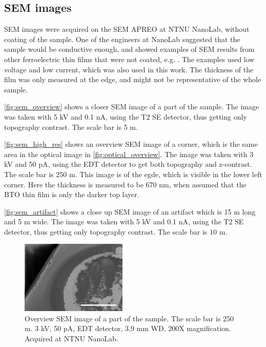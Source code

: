\subsection{SEM images}
\label{results:SEM}

SEM images were acquired on the SEM APREO at NTNU NanoLab, without coating of the sample.
One of the engineers at NanoLab suggested that the sample would be conductive enough, and showed examples of SEM results from other ferroelectric thin films that were not coated, e.g. \cite{hunnestad_visualizing_2019}.
The examples used low voltage and low current, which was also used in this work.
The thickness of the film was only measured at the edge, and might not be representative of the whole sample.

\autoref{fig:sem_overview} shows a closer SEM image of a part of the sample.
The image was taken with 5 kV and 0.1 nA, using the T2 SE detector, thus getting only topography contrast.
The scale bar is 5 \textmu m.

\autoref{fig:sem_high_res} shows an overview SEM image of a corner, which is the same area in the optical image in \autoref{fig:optical_overview}.
The image was taken with 3 kV and 50 pA, using the EDT detector to get both topography and z-contrast.
The scale bar is 250 \textmu m.
This image is of the egde, which is visible in the lower left corner.
Here the thickness is measured to be 670 nm, when assumed that the BTO thin film is only the darker top layer.

\autoref{fig:sem_artifact} shows a close up SEM image of an artifact which is 15 \textmu m long and 5 \textmu m wide.
The image was taken with 5 kV and 0.1 nA, using the T2 SE detector, thus getting only topography contrast.
The scale bar is 10 \textmu m.

\begin{figure}[ht]
    \centering
    \includegraphics[width=0.45\textwidth]{figures/sem_overview_250um.jpg}
    \caption{Overview SEM image of a part of the sample.
        The scale bar is 250 \textmu m.
        3 kV, 50 pA, EDT detector, 3.9 mm WD, 200X magnification.
        Acquired at NTNU NanoLab.
    }
    \label{fig:sem_overview}
\end{figure}

